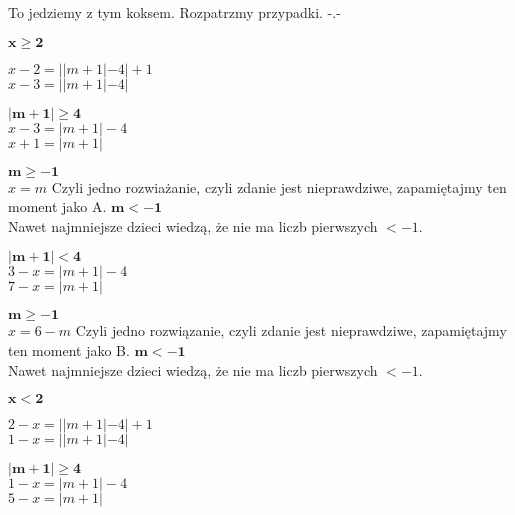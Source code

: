 \documentclass [a4paper, 10pt]{article}
\begin{document}
\rm To jedziemy z tym koksem. Rozpatrzmy przypadki. -.-
\begin{center}
\begin{multicols}{2}
\begin{center}$\mathbf{x \ge 2}$\end{center}
    $x-2 = ||m+1|-4|+1$\\
    $x-3 = ||m+1|-4|$\\
    \begin{multicols}{2}
        $\mathbf{|m+1| \ge 4}$\\
            $x-3 = |m+1|-4$\\
            $x+1 = |m+1|$\\
            \begin{multicols}{2}
                $\mathbf{m \ge -1}$\\
                    $x = m$
                    Czyli jedno rozwiażanie, czyli zdanie jest nieprawdziwe, zapamiętajmy ten moment jako A.
                \vfill\columnbreak
                $\mathbf{m < -1}$\\
                    Nawet najmniejsze dzieci wiedzą, że nie ma liczb pierwszych $< -1$.
            \end{multicols}
        \vfill\columnbreak
        $\mathbf{|m+1| < 4}$\\
            $3-x = |m+1| - 4$\\
            $7-x = |m+1|$\\
            \begin{multicols}{2}
                $\mathbf{m \ge -1}$\\
                    $x = 6-m$
                    Czyli jedno rozwiązanie, czyli zdanie jest nieprawdziwe, zapamiętajmy ten moment jako B.
                \vfill\columnbreak
                $\mathbf{m < -1}$\\
                    Nawet najmniejsze dzieci wiedzą, że nie ma liczb pierwszych $< -1$.
            \end{multicols}
    \end{multicols}
\vfill\columnbreak
\begin{center}$\mathbf{x < 2}$\end{center}
    $2-x = ||m+1|-4|+1$\\
    $1-x = ||m+1|-4|$\\
    \begin{multicols}{2}
        $\mathbf{|m+1| \ge 4}$\\
            $1-x = |m+1|-4$\\
            $5-x = |m+1|$\\

\end{multicols}
\end{multicols}
\end{center}
\end{document}
